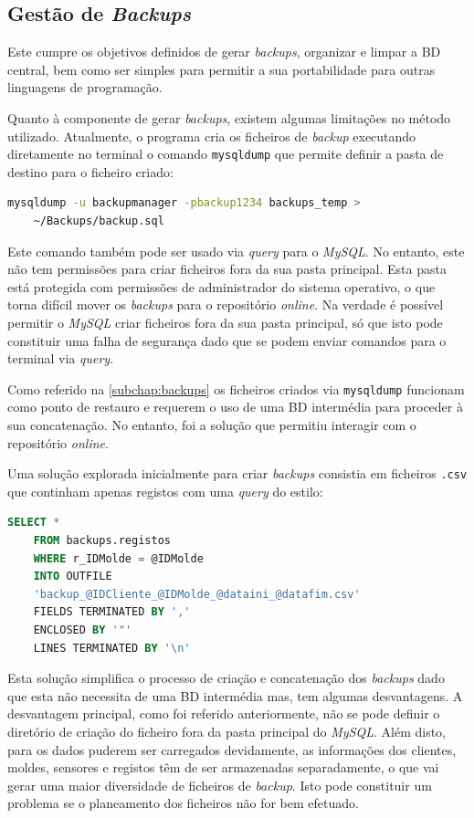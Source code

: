 \documentclass[11pt,twoside,a4paper]{report}
\begin{document}
\subsection{Gestão de \textit{Backups}}
Este cumpre os objetivos definidos de gerar \textit{backups}, organizar e limpar a BD central, bem como ser simples para permitir a sua portabilidade para outras linguagens de programação.\par 
Quanto à componente de gerar \textit{backups}, existem algumas limitações no método utilizado. Atualmente, o programa cria os ficheiros de \textit{backup} executando diretamente no terminal o comando \texttt{mysqldump} que permite definir a pasta de destino para o ficheiro criado:
\begin{lstlisting}[language = bash]
	mysqldump -u backupmanager -pbackup1234 backups_temp >
	~/Backups/backup.sql
\end{lstlisting}
Este comando também pode ser usado via \textit{query} para o \textit{MySQL}. No entanto, este não tem permissões para criar ficheiros fora da sua pasta principal. Esta pasta está protegida com permissões de administrador do sistema operativo, o que torna difícil mover os \textit{backups} para o repositório \textit{online}. Na verdade é possível permitir o \textit{MySQL} criar ficheiros fora da sua pasta principal, só que isto pode constituir uma falha de segurança dado que se podem enviar comandos para o terminal via \textit{query}.\par 
Como referido na \autoref{subchap:backups} os ficheiros criados via \texttt{mysqldump} funcionam como ponto de restauro e requerem o uso de uma BD intermédia para proceder à sua concatenação. No entanto, foi a solução que permitiu interagir com o repositório \textit{online}.\par 
Uma solução explorada inicialmente para criar \textit{backups} consistia em ficheiros \texttt{.csv} que continham apenas registos com uma \textit{query} do estilo:
\begin{lstlisting}[language = SQL]
	SELECT *
	FROM backups.registos
	WHERE r_IDMolde = @IDMolde
	INTO OUTFILE
	'backup_@IDCliente_@IDMolde_@dataini_@datafim.csv'
	FIELDS TERMINATED BY ','
	ENCLOSED BY '"'
	LINES TERMINATED BY '\n'
\end{lstlisting}
Esta solução simplifica o processo de criação e concatenação dos \textit{backups} dado que esta não necessita de uma BD intermédia mas, tem algumas desvantagens. A desvantagem principal, como foi referido anteriormente, não se pode definir o diretório de criação do ficheiro fora da pasta principal do \textit{MySQL}. Além disto, para os dados puderem ser carregados devidamente, as informações dos clientes, moldes, sensores e registos têm de ser armazenadas separadamente, o que vai gerar uma maior diversidade de ficheiros de \textit{backup}. Isto pode constituir um problema se o planeamento dos ficheiros não for bem efetuado.\par 
\end{document}
